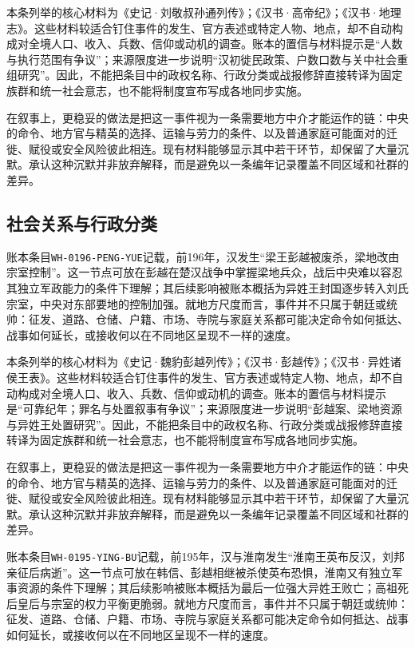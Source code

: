 本条列举的核心材料为《史记·刘敬叔孙通列传》；《汉书·高帝纪》；《汉书·地理志》。这些材料较适合钉住事件的发生、官方表述或特定人物、地点，却不自动构成对全境人口、收入、兵数、信仰或动机的调查。账本的置信与材料提示是“人数与执行范围有争议”；来源限度进一步说明“汉初徙民政策、户数口数与关中社会重组研究”。因此，不能把条目中的政权名称、行政分类或战报修辞直接转译为固定族群和统一社会意志，也不能将制度宣布写成各地同步实施。

在叙事上，更稳妥的做法是把这一事件视为一条需要地方中介才能运作的链：中央的命令、地方官与精英的选择、运输与劳力的条件、以及普通家庭可能面对的迁徙、赋役或安全风险彼此相连。现有材料能够显示其中若干环节，却保留了大量沉默。承认这种沉默并非放弃解释，而是避免以一条编年记录覆盖不同区域和社群的差异。

\subsection{社会关系与行政分类}

账本条目\texttt{WH-0196-PENG-YUE}记载，前196年，汉发生“梁王彭越被废杀，梁地改由宗室控制”。这一节点可放在彭越在楚汉战争中掌握梁地兵众，战后中央难以容忍其独立军政能力的条件下理解；其后续影响被账本概括为异姓王封国逐步转入刘氏宗室，中央对东部要地的控制加强。就地方尺度而言，事件并不只属于朝廷或统帅：征发、道路、仓储、户籍、市场、寺院与家庭关系都可能决定命令如何抵达、战事如何延长，或接收何以在不同地区呈现不一样的速度。

本条列举的核心材料为《史记·魏豹彭越列传》；《汉书·彭越传》；《汉书·异姓诸侯王表》。这些材料较适合钉住事件的发生、官方表述或特定人物、地点，却不自动构成对全境人口、收入、兵数、信仰或动机的调查。账本的置信与材料提示是“可靠纪年；罪名与处置叙事有争议”；来源限度进一步说明“彭越案、梁地资源与异姓王处置研究”。因此，不能把条目中的政权名称、行政分类或战报修辞直接转译为固定族群和统一社会意志，也不能将制度宣布写成各地同步实施。

在叙事上，更稳妥的做法是把这一事件视为一条需要地方中介才能运作的链：中央的命令、地方官与精英的选择、运输与劳力的条件、以及普通家庭可能面对的迁徙、赋役或安全风险彼此相连。现有材料能够显示其中若干环节，却保留了大量沉默。承认这种沉默并非放弃解释，而是避免以一条编年记录覆盖不同区域和社群的差异。

账本条目\texttt{WH-0195-YING-BU}记载，前195年，汉与淮南发生“淮南王英布反汉，刘邦亲征后病逝”。这一节点可放在韩信、彭越相继被杀使英布恐惧，淮南又有独立军事资源的条件下理解；其后续影响被账本概括为最后一位强大异姓王败亡；高祖死后皇后与宗室的权力平衡更脆弱。就地方尺度而言，事件并不只属于朝廷或统帅：征发、道路、仓储、户籍、市场、寺院与家庭关系都可能决定命令如何抵达、战事如何延长，或接收何以在不同地区呈现不一样的速度。

